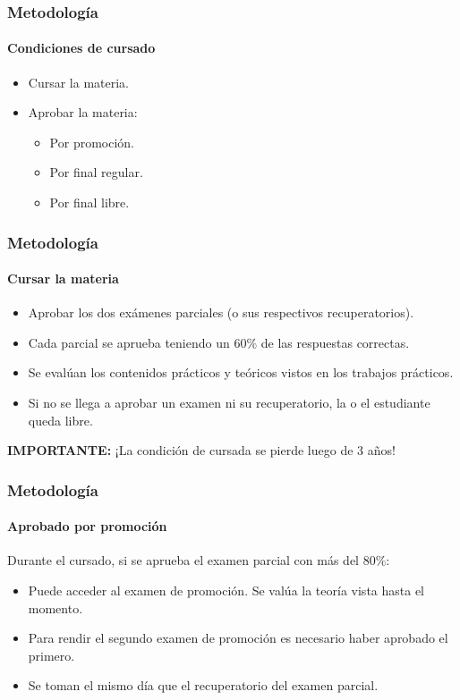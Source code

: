 \documentclass[11pt,a4paper,spanish]{beamer}
\begin{document}
\begin{frame}

    \frametitle{Metodología}
    \framesubtitle{Condiciones de cursado}

\begin{itemize}
    \item Cursar la materia.
    \item Aprobar la materia:
        \begin{itemize}
            \item Por promoción.
            \item Por final regular.
            \item Por final libre.
        \end{itemize}
\end{itemize}

\end{frame}

\begin{frame}

    \frametitle{Metodología}
    \framesubtitle{Cursar la materia}

\begin{itemize}

    \item Aprobar los dos exámenes parciales (o sus respectivos
        recuperatorios).
    \item Cada parcial se aprueba teniendo un $60\%$ de las respuestas
        correctas.
    \item Se evalúan los contenidos prácticos y teóricos vistos en los
        trabajos prácticos.
    \item Si no se llega a aprobar un examen ni su recuperatorio, la o el
        estudiante queda libre.

\end{itemize}

\textbf{IMPORTANTE:} ¡La condición de cursada se pierde luego de 3 años!

\end{frame}

\begin{frame}

    \frametitle{Metodología}
    \framesubtitle{Aprobado por promoción}


Durante el cursado, si se aprueba el examen parcial con más del $80\%$:

\begin{itemize}
    \item Puede acceder al examen de promoción. Se valúa la teoría vista hasta
        el momento.
    \item Para rendir el segundo examen de promoción es necesario haber
        aprobado el primero.
    \item Se toman el mismo día que el recuperatorio del examen parcial.
\end{itemize}

\end{frame}
\end{document}
